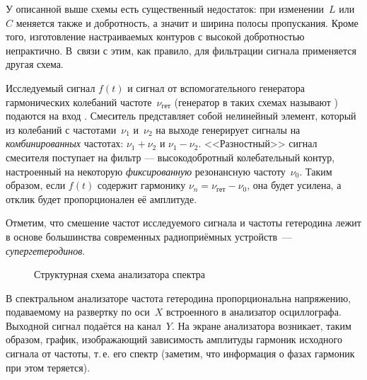 \experiment

У описанной выше схемы есть существенный недостаток: при изменении~$L$ или~$C$
меняется также и добротность, а значит и ширина полосы пропускания.
Кроме того, изготовление настраиваемых контуров с высокой добротностью
непрактично. В~связи с этим, как правило, для фильтрации сигнала
применяется другая схема.

Исследуемый сигнал $f(t)$ и сигнал от вспомогательного генератора гармонических
колебаний частоте~$\nu_{гет}$ (генератор в таких схемах называют
) подаются на вход . Смеситель
представляет собой нелинейный элемент, который из колебаний с частотами~$\nu_1$
и~$\nu_2$ на выходе генерирует сигналы на \emph{комбинированных}
частотах: $\nu_1 + \nu_2$ и $\nu_1 - \nu_2$.
<<Разностный>> сигнал смесителя поступает на фильтр ---
высокодобротный колебательный контур, настроенный на некоторую \emph{фиксированную}
резонансную частоту~$\nu_0$. Таким образом, если $f(t)$ содержит гармонику
$\nu_n=\nu_{гет}-\nu_0$, она будет усилена, а отклик будет
пропорционален её амплитуде.

Отметим, что смешение частот исследуемого сигнала и частоты гетеродина лежит в
основе большинства современных радиоприёмных устройств~---
\emph{супергетеродинов}.

\begin{figure}[h!]
\hfil
{}
\caption{Структурная схема анализатора спектра}
\end{figure}

В спектральном анализаторе частота гетеродина пропорциональна напряжению,
подаваемому на развертку по оси~$X$ встроенного в анализатор осциллографа.
Выходной сигнал подаётся на канал~$Y$. На экране анализатора возникает, таким
образом, график, изображающий зависимость амплитуды гармоник исходного сигнала
от частоты, т.\,е. его спектр (заметим, что информация о фазах гармоник при этом
теряется).


